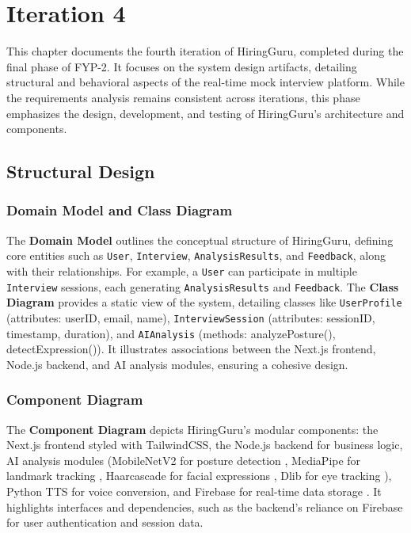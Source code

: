 \chapter{Iteration 4}
\label{ch:iter4}

This chapter documents the fourth iteration of HiringGuru, completed during the final phase of FYP-2. It focuses on the system design artifacts, detailing structural and behavioral aspects of the real-time mock interview platform. While the requirements analysis remains consistent across iterations, this phase emphasizes the design, development, and testing of HiringGuru’s architecture and components.

\section{Structural Design}

\subsection{Domain Model and Class Diagram}
The \textbf{Domain Model} outlines the conceptual structure of HiringGuru, defining core entities such as \texttt{User}, \texttt{Interview}, \texttt{AnalysisResults}, and \texttt{Feedback}, along with their relationships. For example, a \texttt{User} can participate in multiple \texttt{Interview} sessions, each generating \texttt{AnalysisResults} and \texttt{Feedback}. The \textbf{Class Diagram} provides a static view of the system, detailing classes like \texttt{UserProfile} (attributes: userID, email, name), \texttt{InterviewSession} (attributes: sessionID, timestamp, duration), and \texttt{AIAnalysis} (methods: analyzePosture(), detectExpression()). It illustrates associations between the Next.js frontend, Node.js backend, and AI analysis modules, ensuring a cohesive design.

\subsection{Component Diagram}
The \textbf{Component Diagram} depicts HiringGuru’s modular components: the Next.js frontend styled with TailwindCSS, the Node.js backend for business logic, AI analysis modules (MobileNetV2 for posture detection \cite{howard2018mobilenetv2}, MediaPipe for landmark tracking \cite{lugaresi2019mediapipe}, Haarcascade for facial expressions \cite{viola2001haar}, Dlib for eye tracking \cite{king2009dlib}), Python TTS for voice conversion, and Firebase for real-time data storage \cite{firebase2023docs}. It highlights interfaces and dependencies, such as the backend’s reliance on Firebase for user authentication and session data.

